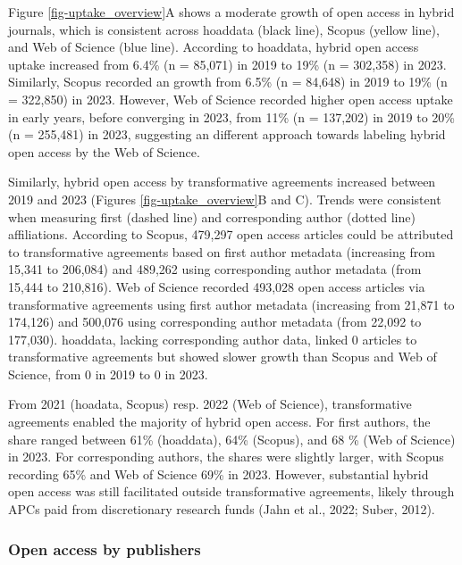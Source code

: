 \documentclass[a4paper,man,floatsintext,longtable,noextraspace,10pt]{apa6}
\begin{document}
Figure \ref{fig-uptake_overview}A shows a moderate growth of open access
in hybrid journals, which is consistent across hoaddata (black line),
Scopus (yellow line), and Web of Science (blue line). According to
hoaddata, hybrid open access uptake increased from 6.4\% (n = 85,071) in
2019 to 19\% (n = 302,358) in 2023. Similarly, Scopus recorded an growth
from 6.5\% (n = 84,648) in 2019 to 19\% (n = 322,850) in 2023. However,
Web of Science recorded higher open access uptake in early years, before
converging in 2023, from 11\% (n = 137,202) in 2019 to 20\% (n =
255,481) in 2023, suggesting an different approach towards labeling
hybrid open access by the Web of Science.

Similarly, hybrid open access by transformative agreements increased
between 2019 and 2023 (Figures \ref{fig-uptake_overview}B and C). Trends
were consistent when measuring first (dashed line) and corresponding
author (dotted line) affiliations. According to Scopus, 479,297 open
access articles could be attributed to transformative agreements based
on first author metadata (increasing from 15,341 to 206,084) and 489,262
using corresponding author metadata (from 15,444 to 210,816). Web of
Science recorded 493,028 open access articles via transformative
agreements using first author metadata (increasing from 21,871 to
174,126) and 500,076 using corresponding author metadata (from 22,092 to
177,030). hoaddata, lacking corresponding author data, linked 0 articles
to transformative agreements but showed slower growth than Scopus and
Web of Science, from 0 in 2019 to 0 in 2023.

From 2021 (hoadata, Scopus) resp. 2022 (Web of Science), transformative
agreements enabled the majority of hybrid open access. For first
authors, the share ranged between 61\% (hoaddata), 64\% (Scopus), and 68
\% (Web of Science) in 2023. For corresponding authors, the shares were
slightly larger, with Scopus recording 65\% and Web of Science 69\% in
2023. However, substantial hybrid open access was still facilitated
outside transformative agreements, likely through APCs paid from
discretionary research funds (Jahn et al., 2022; Suber, 2012).

\subsubsection{Open access by
publishers}\label{open-access-by-publishers}
\end{document}
